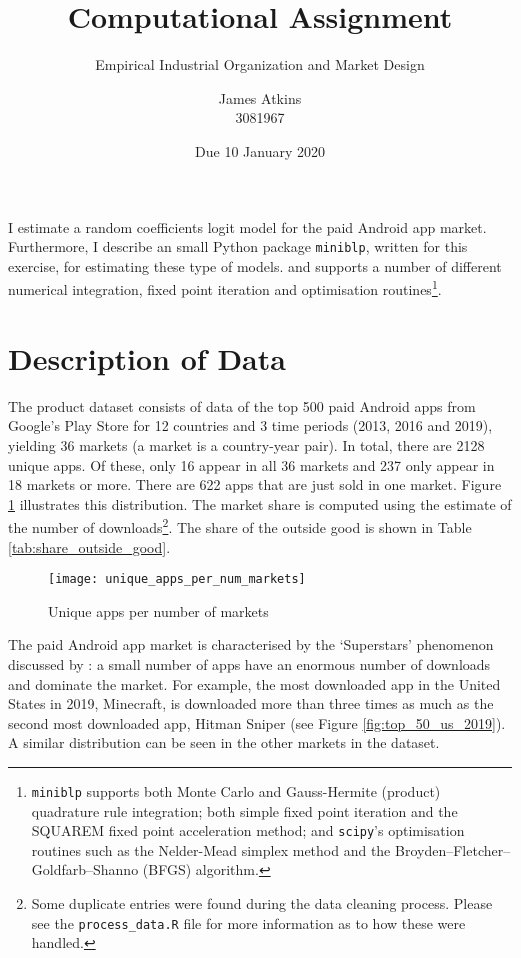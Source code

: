 \documentclass[parskip=half]{scrartcl}
\title{Computational Assignment}
\subtitle{Empirical Industrial Organization and Market Design}
\author{James Atkins \\ 3081967}
\date{Due 10 January 2020}
\newcommand{\code}[1]{\texttt{#1}}
\begin{document}
	
\maketitle

I estimate a random coefficients logit model for the paid Android app market. 
Furthermore, I describe an small Python package \code{miniblp}, written for this exercise, for estimating these type of models. and supports a number of different numerical integration, fixed point iteration and optimisation routines\footnote{\code{miniblp} supports both Monte Carlo and  Gauss-Hermite (product) quadrature rule integration; both simple fixed point iteration and the SQUAREM fixed point acceleration method; and \code{scipy}'s optimisation routines such as the Nelder-Mead simplex method and the Broyden–Fletcher–Goldfarb–Shanno (BFGS) algorithm.}.

\tableofcontents

\pagebreak
\section{Description of Data}

The product dataset consists of data of the top 500 paid Android apps from Google's Play Store for 12 countries and 3 time periods (2013, 2016 and 2019), yielding 36 markets (a market is a country-year pair). In total, there are 2128 unique apps. Of these, only 16 appear in all 36 markets and 237 only appear in 18 markets or more. There are 622 apps that are just sold in one market. Figure \ref{fig:unique_apps_per_num_markets} illustrates this distribution. The market share is computed using the estimate of the number of downloads\footnote{Some duplicate entries were found during the data cleaning process. Please see the \code{process\_data.R} file for more information as to how these were handled.}. The share of the outside good is shown in Table \ref{tab:share_outside_good}.

\begin{figure}[ht]
	\centering
	\texttt{[image: unique\_apps\_per\_num\_markets]}
	\caption{Unique apps per number of markets}
	\label{fig:unique_apps_per_num_markets}
\end{figure}



The paid Android app market is characterised by the `Superstars' phenomenon discussed by \cite{rosen1981economics}: a small number of apps have an enormous number of downloads and dominate the market. For example, the most downloaded app in the United States in 2019, Minecraft, is downloaded more than three times as much as the second most downloaded app, Hitman Sniper (see Figure \ref{fig:top_50_us_2019}). A similar distribution can be seen in the other markets in the dataset.
\end{document}
